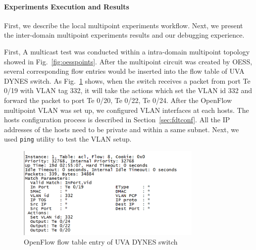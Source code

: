\paragraph{Experiments Execution and Results}
First, we describe the local multipoint experiments workflow. Next, we present the inter-domain multipoint experiments results and our debugging experience.  


First, A multicast test was conducted within a intra-domain multipoint topology showed in Fig.~\ref{fig:oesspoints}. After the multipoint circuit was created by OESS, several corresponding flow entries would be inserted into the flow table of UVA DYNES switch. As Fig.~\ref{fig:flowtable} shows, when the switch receives a packet from port Te 0/19 with VLAN tag 332, it will take the actions which set the VLAN id 332 and forward the packet to port Te 0/20, Te 0/22, Te 0/24. After the OpenFlow multipoint VLAN was set up, we configured VLAN interfaces at each hosts. The hosts configuration process is described in Section~\ref{sec:fdtconf}. All the IP addresses of the hosts need to be private and within a same subnet. Next, we used \texttt{ping} utility to test the VLAN setup. 

\begin{figure}[htb!]
\centering
\includegraphics[width=0.8\textwidth]{figures/flow-table.png}
\caption{OpenFlow flow table entry of UVA DYNES switch}
\label{fig:flowtable}
\end{figure}

